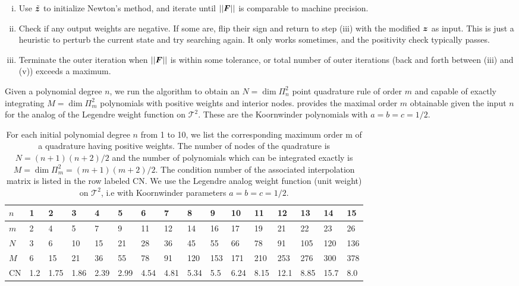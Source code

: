 \begin{enumerate}[(i)]
\item Use $\tilde{\boldsymbol{z}}$ to initialize Newton's method, and iterate until $||\boldsymbol{F}||$ is comparable to machine precision. 
\item Check if any output weights are negative. If some are, flip their sign and return to step (iii) with the modified $\boldsymbol{z}$ as input. \color{red} This is just a heuristic to perturb the current state and try searching again. It only works sometimes, and the positivity check typically passes.\color{black}
\item Terminate the outer iteration when $||\boldsymbol{F}||$ is within some tolerance, or total number of outer iterations (back and forth between (iii) and (v)) exceeds a maximum.
\end{enumerate}

Given a polynomial degree $n$, we run the algorithm to obtain an $N=\dim\Pi_{n}^2$ point quadrature rule of order $m$ and capable of exactly integrating $M=\dim\Pi_m^2$ polynomials with positive weights and interior nodes.  provides the maximal order $m$ obtainable given the input $n$ for the analog of the Legendre weight function on $\mathcal{T}^2$. These are the Koornwinder polynomials with $a=b=c=1/2$.
\begin{table}[H]
	\centering
	\caption{For each initial polynomial degree $n$ from 1 to 10, we list the
		corresponding maximum order m of a quadrature having positive weights. The number of nodes of the quadrature is $N = (n + 1)(n + 2)/2$ and the number of polynomials which can be integrated exactly is $M = \dim\Pi_m^2 = (m + 1)(m + 2)/2$. The condition number of the associated interpolation matrix is listed in the row labeled CN. We use the Legendre analog weight function (unit weight) on $\mathcal{T}^2$, i.e with Koornwinder parameters $a=b=c=1/2$.}\label{tab:quadverif}
	\begin{tabular}{|l|l|l|l|l|l|l|l|l|l|l|l|l|l|l|l|}
		\hline
		$n$ & 1   & 2   & 3   & 4   & 5   & 6   & 7    & 8    & 9    & 10   & 11   & 12   & 13   & 14 & 15 \\ \hline
		$m$ & 2   & 4   & 5   & 7   & 9   & 11  & 12   & 14   & 16   & 17   & 19   & 21   & 22   & 23 & 26  \\ \hline
		$N$ & 3   & 6   & 10  & 15  & 21  & 28  & 36   & 45   & 55   & 66   & 78   & 91   & 105  & 120 & 136 \\ \hline
		$M$ & 6   & 15  & 21  & 36  & 55  & 78  & 91   & 120  & 153  & 171  & 210  & 253  & 276  & 300 & 378 \\ \hline
		CN  & 1.2 & 1.75 & 1.86 & 2.39 & 2.99 & 4.54 & 4.81 & 5.34 & 5.5 & 6.24 & 8.15 & 12.1 & 8.85 & 15.7 & 8.0  \\ \hline
	\end{tabular}
\end{table}
